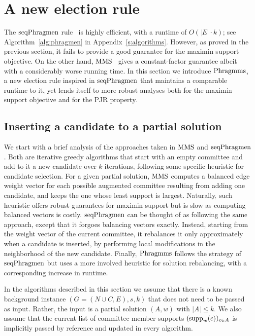 \section{A new election rule}\label{s:heuristic}

The $\operatorname{seqPhragmen}$ rule~\cite{brill2017phragmen} is highly efficient, with a runtime of $O(|E|\cdot k)$; see Algorithm~\ref{alg:phragmen} in Appendix~\ref{s:algorithms}. 
However, as proved in the previous section, it fails to provide a good guarantee for the maximin support objective. 
On the other hand, $\operatorname{MMS}$~\cite{sanchez2016maximin} gives a constant-factor guarantee albeit with a considerably worse running time.
In this section we introduce $\operatorname{Phragmms}$, a new election rule inspired in $\operatorname{seqPhragmen}$ that maintains a comparable runtime to it, yet lends itself to more robust analyses both for the maximin support objective and for the PJR property. 

\subsection{Inserting a candidate to a partial solution}\label{s:inserting}

We start with a brief analysis of the approaches taken in $\operatorname{MMS}$ and $\operatorname{seqPhragmen}$. 
Both are iterative greedy algorithms that start with an empty committee and add to it a new candidate over $k$ iterations, following some specific heuristic for candidate selection.
For a given partial solution, $\operatorname{MMS}$ computes a balanced edge weight vector for each possible augmented committee resulting from adding one candidate, and keeps the one whose least support is largest. 
Naturally, such heuristic offers robust guarantees for maximin support but is slow as computing balanced vectors is costly. 
$\operatorname{seqPhragmen}$ can be thought of as following the same approach, except that it forgoes balancing vectors exactly. Instead, starting from the weight vector of the current committee, it rebalances it only approximately when a candidate is inserted, by performing local modifications in the neighborhood of the new candidate. 
Finally, $\operatorname{Phragmms}$ follows the strategy of $\operatorname{seqPhragmen}$ but uses a more involved heuristic for solution rebalancing, with a corresponding increase in runtime. 

In the algorithms described in this section we assume that there is a known background instance $(G=(N\cup C, E), s, k)$ that does not need to be passed as input. Rather, the input is a partial solution $(A,w)$ with $|A|\leq k$. We also assume that the current list of committee member supports $(\operatorname{supp}_w(c))_{c\in A}$ is implicitly passed by reference and updated in every algorithm.

